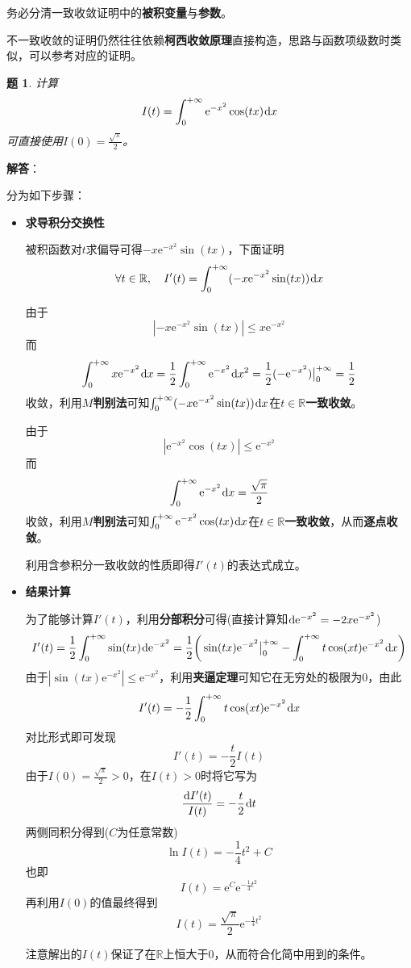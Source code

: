 \documentclass[a4paper,UTF8,fontset=windows,AutoFakeBold]{ctexart}
\newcommand*{\dr}{\hspace{0.07em}\mathrm{d}}
\newcommand*{\er}{\mathrm{e}}
\newcommand*{\rb}{\mathbb{R}}
\newcommand*{\note}{\noindent *}
\theoremstyle{ex}
\newtheorem{exercise}{题}
\newcommand{\sol}[1]{{\vspace{5pt}\kaishu\noindent\textbf{解答}：\vspace{-3pt}
\begin{compactitem}
    \item[] #1
\end{compactitem}
}}
\begin{document}
\note 务必分清一致收敛证明中的\textbf{被积变量}与\textbf{参数}。

\note 不一致收敛的证明仍然往往依赖\textbf{柯西收敛原理}直接构造，思路与函数项级数时类似，可以参考对应的证明。

\begin{framed}
\begin{exercise}
    计算
    $$I(t)=\int_0^{+\infty}\er^{-x^2}\cos(tx)\dr x$$
    可直接使用$I(0)=\frac{\sqrt\pi}{2}$。
\end{exercise}
\sol{
    分为如下步骤：
    \begin{itemize}
        \item \textbf{求导积分交换性}
        
        被积函数对$t$求偏导可得$-x\er^{-x^2}\sin(tx)$，下面证明
        $$\forall t\in\rb,\quad I'(t)=\int_0^{+\infty}(-x\er^{-x^2}\sin(tx))\dr x$$

        由于
        $$|-x\er^{-x^2}\sin(tx)|\le x\er^{-x^2}$$
        而
        $$\int_0^{+\infty}x\er^{-x^2}\dr x=\frac{1}{2}\int_0^{+\infty}\er^{-x^2}\dr x^2=\frac{1}{2}(-\er^{-x^2})\big|^{+\infty}_0=\frac{1}{2}$$
        收敛，利用\textbf{$M$判别法}可知$\int_0^{+\infty}(-x\er^{-x^2}\sin(tx))\dr x$在$t\in\rb$\textbf{一致收敛}。

        由于
        $$|\er^{-x^2}\cos(tx)|\le\er^{-x^2}$$
        而
        $$\int_0^{+\infty}\er^{-x^2}\dr x=\frac{\sqrt\pi}{2}$$
        收敛，利用\textbf{$M$判别法}可知$\int_0^{+\infty}\er^{-x^2}\cos(tx)\dr x$在$t\in\rb$\textbf{一致收敛}，从而\textbf{逐点收敛}。

        利用含参积分一致收敛的性质即得$I'(t)$的表达式成立。

        \item \textbf{结果计算}

        为了能够计算$I'(t)$，利用\textbf{分部积分}可得(直接计算知$\dr\er^{-x^2}=-2x\er^{-x^2}$)
        $$I'(t)=\frac{1}{2}\int_0^{+\infty}\sin(tx)\dr\er^{-x^2}=\frac{1}{2}\bigg(\sin(tx)\er^{-x^2}\big|^{+\infty}_0-\int_0^{+\infty}t\cos(xt)\er^{-x^2}\dr x\bigg)$$
        由于$|\sin(tx)\er^{-x^2}|\le\er^{-x^2}$，利用\textbf{夹逼定理}可知它在无穷处的极限为0，由此
        $$I'(t)=-\frac{1}{2}\int_0^{+\infty}t\cos(xt)\er^{-x^2}\dr x$$
        对比形式即可发现
        $$I'(t)=-\frac{t}{2}I(t)$$
        由于$I(0)=\frac{\sqrt\pi}{2}>0$，在$I(t)>0$时将它写为
        $$\frac{\dr I'(t)}{I(t)}=-\frac{t}{2}\dr t$$
        两侧同积分得到($C$为任意常数)
        $$\ln I(t)=-\frac{1}{4}t^2+C$$
        也即
        $$I(t)=\er^C\er^{-\frac{1}{4}t^2}$$
        再利用$I(0)$的值最终得到
        $$I(t)=\frac{\sqrt\pi}{2}\er^{-\frac{1}{4}t^2}$$

        \note 注意解出的$I(t)$保证了在$\rb$上恒大于0，从而符合化简中用到的条件。
    \end{itemize}
}
\end{framed}
\end{document}
